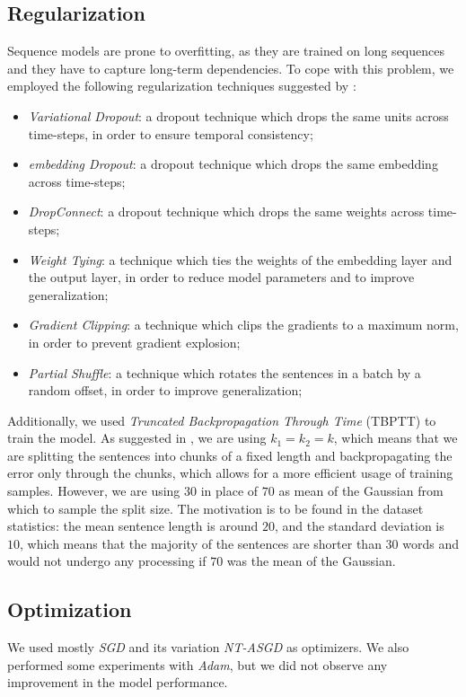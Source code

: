 \subsection{Regularization}
Sequence models are prone to overfitting, as they are trained on long sequences and they have to capture long-term dependencies. To cope with this problem, we employed the following regularization techniques suggested by \cite{merity2017regularizing}:
\begin{itemize}
    \item \emph{Variational Dropout}\cite{gal2016theoretically}: a dropout technique which drops the same units across time-steps, in order to ensure temporal consistency;
    \item \emph{embedding Dropout}\cite{gal2016theoretically}: a dropout technique which drops the same embedding across time-steps;
    \item \emph{DropConnect}\cite{wan2013dropconnect}: a dropout technique which drops the same weights across time-steps;
    \item \emph{Weight Tying}\cite{press2017tying}: a technique which ties the weights of the embedding layer and the output layer, in order to reduce model parameters and to improve generalization;
    \item \emph{Gradient Clipping}: a technique which clips the gradients to a maximum norm, in order to prevent gradient explosion;
    \item \emph{Partial Shuffle}\cite{press2019partially}: a technique which rotates the sentences in a batch by a random offset, in order to improve generalization;
\end{itemize}
Additionally, we used \emph{Truncated Backpropagation Through Time} (TBPTT) to train the model. As suggested in \cite{merity2017regularizing}, we are using $k_1 = k_2 = k$, which means that we are splitting the sentences into chunks of a fixed length and backpropagating the error only through the chunks, which allows for a more efficient usage of training samples. However, we are using $30$ in place of $70$ as mean of the Gaussian from which to sample the split size. The motivation is to be found in the dataset statistics: the mean sentence length is around $20$, and the standard deviation is $10$, which means that the majority of the sentences are shorter than $30$ words and would not undergo any processing if $70$ was the mean of the Gaussian.

\subsection{Optimization}
We used mostly \emph{SGD} and its variation \emph{NT-ASGD}\cite{merity2017regularizing} as optimizers. We also performed some experiments with \emph{Adam}, but we did not observe any improvement in the model performance. 
